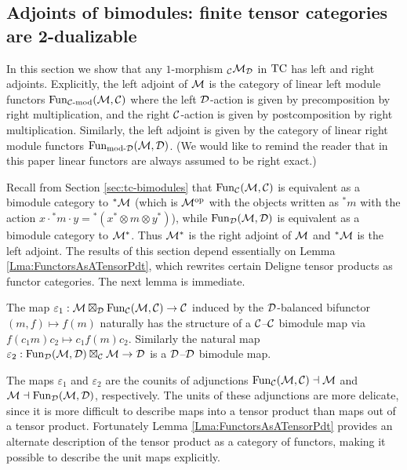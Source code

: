 \documentclass{amsart}
\begin{document}
\subsection{Adjoints of bimodules: finite tensor categories are 2-dualizable}  \label{sec:df-modules}

In this section we show that any $1$-morphism ${}_\mathcal C \mathcal M_\mathcal D$ in $\mathrm{TC}$ has left and right adjoints.   Explicitly, the left adjoint of $\mathcal M$ is the category of linear left module functors $\operatorname{Fun}_{{\mathcal C\text{-mod}}}(\mathcal M, \mathcal C)$ where the left $\mathcal D$-action is given by precomposition by right multiplication, and the right $\mathcal C$-action is given by postcomposition by right multiplication.  Similarly, the left adjoint is given by the category of linear right module functors $\operatorname{Fun}_{\text{mod-}\mathcal D}(\mathcal M, \mathcal D)$.   (We would like to remind the reader that in this paper linear functors are always assumed to be right exact.)  

Recall from Section \ref{sec:tc-bimodules} that 
$\operatorname{Fun}_{{\mathcal C}}(\mathcal M, \mathcal C)$ is equivalent as a bimodule category to ${}^*\mathcal M$ (which is $\mathcal M^{\mathrm{op}}$ with the objects written as ${}^*m$ with the action $x \cdot {}^*m \cdot y = {}^*(x^* \otimes m \otimes y^*)$), while $\operatorname{Fun}_{\mathcal D}(\mathcal M, \mathcal D)$ is equivalent as a bimodule category to $\mathcal M^*$.  Thus $\mathcal M^*$ is the right adjoint of $\mathcal M$ and ${}^* \mathcal M$ is the left adjoint.
The results of this section depend essentially on Lemma \ref{Lma:FunctorsAsATensorPdt}, which rewrites certain Deligne tensor products as functor categories. The next lemma is immediate. 

\begin{lemma}
The map $\varepsilon_1: \mathcal M \boxtimes_{\mathcal D} \operatorname{Fun}_{\mathcal C}(\mathcal M, \mathcal C) \rightarrow \mathcal C$ induced by the $\mathcal D$-balanced bifunctor $(m, f) \mapsto f(m)$ naturally has the structure of a $\mathcal C$--$\mathcal C$ bimodule map via $ f(c_1 m) c_2 \mapsto c_1 f(m) c_2$. Similarly the natural map $\varepsilon_2: \operatorname{Fun}_{{\mathcal D}}(\mathcal M, \mathcal D) \boxtimes_{\mathcal C} \mathcal M \rightarrow \mathcal D$ is a $\mathcal D$--$\mathcal D$ bimodule map. 
\end{lemma} 

The maps $\varepsilon_1$ and $\varepsilon_2$ are the counits of adjunctions $\operatorname{Fun}_{\mathcal C}(\mathcal M, \mathcal C) \dashv \mathcal M$ and $\mathcal M \dashv \operatorname{Fun}_{{\mathcal D}}(\mathcal M, \mathcal D)$, respectively. The units of these adjunctions are more delicate, since it is more difficult to describe maps into a tensor product than maps out of a tensor product. Fortunately Lemma \ref{Lma:FunctorsAsATensorPdt} provides an alternate description of the tensor product as a category of functors, making it possible  to describe the unit maps explicitly. 
\end{document}
